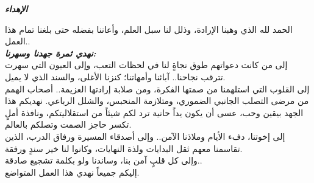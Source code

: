 \thispagestyle{empty}
\vspace*{\fill}

\begin{center}
\begin{Arabic}
{\fontsize{20}{24}\selectfont\bfseries\itshape الإهداء}
\end{Arabic}
\end{center}
\vspace{1.2cm}

\begin{center}
\begin{Arabic}
\fontsize{13}{24}\selectfont
{}
\itshape

الحمد لله الذي وهبنا الإرادة، وذلل لنا سبل العلم، وأعاننا بفضله حتى بلغنا تمام هذا العمل..\\[1.2em]

{\bfseries\itshape نهدي ثمرة جهدنا وسهرنا:}\\[1.2em]

إلى من كانت دعواتهم طوق نجاةٍ لنا في لحظات التعب، وإلى العيون التي سهرت تترقب نجاحنا.. آبائنا وأمهاتنا؛ كنزنا الأغلى، والسند الذي لا يميل.\\[1.2em]

إلى القلوب التي استلهمنا من صمتها الفكرة، ومن صلابة إرادتها العزيمة.. أصحاب الهمم من مرضى التصلب الجانبي الضموري، ومتلازمة المنحبس، والشلل الرباعي. نهديكم هذا الجهد بيقين وحب، عسى أن يكون يداً حانية ترد لكم شيئاً من استقلاليتكم، ونافذة أملٍ تكسر حاجز الصمت وتصلكم بالعالم.\\[1.2em]

إلى إخوتنا، دفء الأيام وملاذنا الآمن.. وإلى أصدقاء المسيرة ورفاق الدرب، الذين تقاسمنا معهم ثقل البدايات ولذة النهايات، وكانوا لنا خير سندٍ ورفقة.\\[1.2em]

وإلى كل قلبٍ آمن بنا، وساندنا ولو بكلمة تشجيع صادقة..\\[1.2em]

إليكم جميعاً نهدي هذا العمل المتواضع.

\end{Arabic}
\end{center}

\vspace*{\fill}
\clearpage
